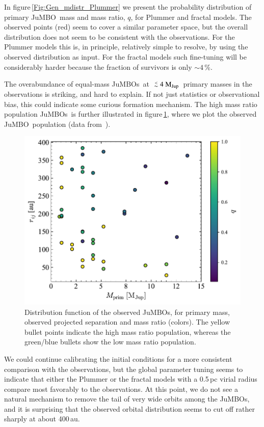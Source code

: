 \documentclass[submission,phys]{lib/SciPost}
\newcommand{\MJup}{\mbox{$\mathrm{{M}}_{\rm Jup}$}}
\def\aplt{\ {\raise-.5ex\hbox{$\buildrel<\over\sim$}}\ }
\newcommand{\jumbo}{\mbox{JuMBO}}
\newcommand{\jumbos}{\mbox{JuMBOs}}
\begin{document}
In figure\,\ref{Fig:Gen_mdistr_Plummer} we present the probability
distribution of primary \jumbo\, mass and mass ratio, $q$, for Plummer
and fractal models.  The observed points (red) seem to cover a similar
parameter space, but the overall distribution does not seem to be
consistent with the observations. For the Plummer models this is, in
principle, relatively simple to resolve, by using the observed
distribution as input. For the fractal models such fine-tuning will be
considerably harder because the fraction of survivors is only $\sim
4$\,\%.

The overabundance of equal-mass \jumbos\, at $\aplt 4$\,\MJup\,
primary masses in the observations is striking, and hard to
explain. If not just statistics or observational bias, this could
indicate some curious formation mechanism. The high mass ratio
population \jumbos\, is further illustrated in
figure\,\ref{Fig:obs_q_mprim_sep}, where we plot the observed \jumbo\,
population (data from \,\cite{2023arXiv231001231P}).

\begin{figure}
    \centering
    \includegraphics[width=0.75\columnwidth]{figures/obs_q_mprim_sep.pdf}
    \caption{Distribution function of the observed \jumbos, for
      primary mass, observed projected separation and mass ratio
      (colors). The yellow bullet points indicate the high mass ratio
      population, whereas the green/blue bullets show the low mass
      ratio population.
    }
    \label{Fig:obs_q_mprim_sep}
\end{figure}

We could continue calibrating the initial conditions for a more
consistent comparison with the observations, but the global parameter
tuning seems to indicate that either the Plummer or the fractal models
with a 0.5\,pc virial radius compare most favorably to the
observations.  At this point, we do not see a natural mechanism to
remove the tail of very wide orbits among the \jumbos, and it is 
surprising that the observed orbital distribution seems to cut off
rather sharply at about 400\,au.
\end{document}
